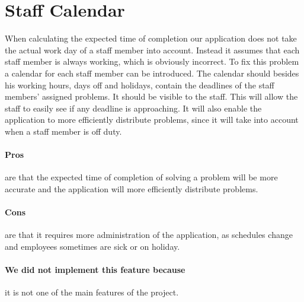 \section{Staff Calendar}
\label{sec:staffCalendar}
When calculating the expected time of completion our application does not take the actual work day of a staff member into account. 
Instead it assumes that each staff member is always working, which is obviously incorrect. 
To fix this problem a calendar for each staff member can be introduced. 
The calendar should besides his working hours, days off and holidays, contain the deadlines of the staff members' assigned problems. 
It should be visible to the staff. 
This will allow the staff to easily see if any deadline is approaching. 
It will also enable the application to more efficiently distribute problems, since it will take into account when a staff member is off duty. 

\paragraph{Pros} are that the expected time of completion of solving a problem will be more accurate and the application will more efficiently distribute problems.
\paragraph{Cons} are that it requires more administration of the application, as schedules change and employees sometimes are sick or on holiday.
\paragraph{We did not implement this feature because} it is not one of the main features of the project.